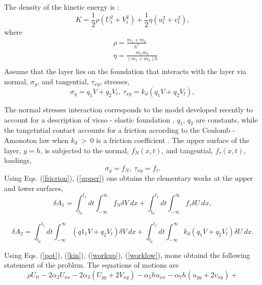 The density of the kinetic energy is \cite{porsp17}:
\begin{equation}
	K = \frac{1}{2} \rho (U_t^2 + V_t^2) + \frac{1}{2} \eta (u_t^2 + v_t^2), \label{kin}
\end{equation}
where
\begin{equation}
	\begin{aligned}
		& \rho = \frac{m_1+m_2}{h^3} \\ 
		& \eta = \frac{m_1 m_2}{(m_1 + m_2)h} \\
	\end{aligned}
\end{equation}
Assume that the layer lies on the foundation that interacts with the layer via normal, $\sigma_y$, and tangential, $\tau_{xy}$, stresses,
\begin{equation}
	\sigma_{y}=q_1 V + q_2 V_t , ~
	\tau_{xy}= k_d (q_1 V + q_2 V_t), \label{friction}
\end{equation}

The normal stresses  interaction corresponds to the model developed recently to account for a description of vicso - elastic  foundation  \cite{Kerr}, $q_1$, $q_2$ are constants,   while the tangetntial contact accounts for a  friction according to the Coulomb - Amonoton law  when $k_d~>~0$ is a friction coefficient \cite{Hahner}. The upper surface of the layer, $y=h$,  is subjected to the normal, $f_N(x,t)$, and tangential, $f_\tau(x,t)$, loadings,
\begin{equation}
	\sigma_{y}=f_{N}, ~\tau_{xy}=f_{\tau}. \label{upper}
\end{equation}
Using Eqs. (\ref{fricrion}), (\ref{upper}) one obtains the elementary works at the upper and lower surfaces,
\begin{equation}
	\delta A_1 =  \int_{t_0}^{t_1} dt\int_{-\infty}^{\infty}f_{N}\delta V \:  dx +\int_{t_0}^{t_1} dt  
	\int_{-\infty}^{\infty} f_{\tau}\delta U \: dx , \label{workup}
\end{equation}

\begin{equation}
	\delta A_2 =  \int_{t_0}^{t_1} dt \int_{-\infty}^{\infty}(q1_1 V + q_2 V_t)\delta V \:  dx + \int_{t_0}^{t_1} dt
	\int_{-\infty}^{\infty}k_d(q_1 V + q_2 V_t)\delta U \:  dx.  \label{worklow}
\end{equation}

Using Eqs. (\ref{pot}), (\ref{kin}), (\ref{workup}), (\ref{worklow}), mone obtaind the following statement of the problrm.  The equations of motions are 
\[
\rho U_{tt} -2 \alpha_2 U_{xx} -2 \alpha_3 \left( U_{yy} + 2 V_{xy}\right) - \alpha_5 h u_{xx} - \alpha_7 h (u_{yy} + 2 v_{xy}) +
\]

